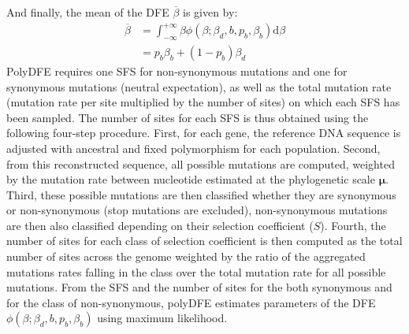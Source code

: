 \documentclass{article}
\newcommand{\UniDimArray}[1]{\bm{#1}}
\newcommand{\der}{\mathrm{d}}
\newcommand{\Sphy}{S}
\newcommand{\Spop}{\beta}
\newcommand{\SpopMean}{\overline{\Spop}}
\begin{document}
    And finally, the mean of the DFE $\overline{\Spop}$ is given by:
    \begin{align*}
        \SpopMean & = \int_{-\infty}^{+\infty} \Spop \phi \left( \Spop; \Spop_d , b, p_b, \Spop_b \right) \der \Spop \\
        & =  p_b \Spop_b + \left( 1 - p_b \right) \Spop_d
    \end{align*}
    PolyDFE requires one SFS for non-synonymous mutations and one for synonymous mutations (neutral expectation), as well as the total mutation rate (mutation rate per site multiplied by the number of sites) on which each SFS has been sampled.
    The number of sites for each SFS is thus obtained using the following four-step procedure.
    First, for each gene, the reference DNA sequence is adjusted with ancestral and fixed polymorphism for each population.
    Second, from this reconstructed sequence, all possible mutations are computed, weighted by the mutation rate between nucleotide estimated at the phylogenetic scale $\UniDimArray{\mu}$.
    Third, these possible mutations are then classified whether they are synonymous or non-synonymous (stop mutations are excluded), non-synonymous mutations are then also classified depending on their selection coefficient ($\Sphy$).
    Fourth, the number of sites for each class of selection coefficient is then computed as the total number of sites across the genome weighted by the ratio of the aggregated mutations rates falling in the class over the total mutation rate for all possible mutations.
    From the SFS and the number of sites for the both synonymous and for the class of non-synonymous, polyDFE estimates parameters of the DFE $\phi \left( \Spop; \Spop_d , b, p_b, \Spop_b \right)$ using maximum likelihood.

    \printbibliography
\end{document}
